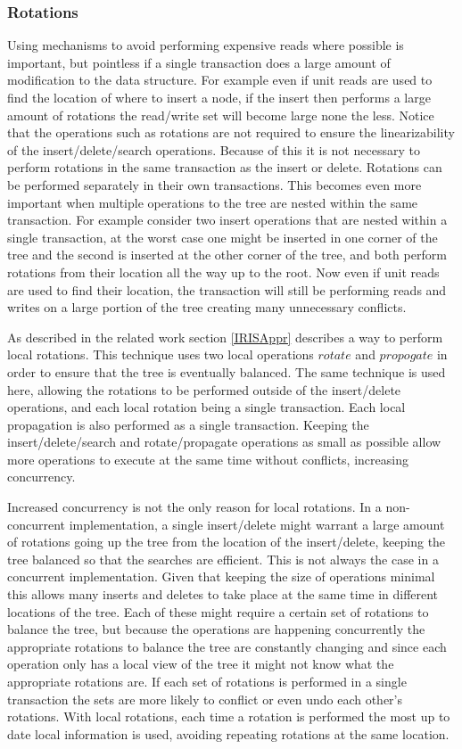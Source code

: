 \documentclass[10pt]{sigplanconf}
\begin{document}
\subsubsection{Rotations}
Using mechanisms to avoid performing expensive reads where possible is important, but pointless if a single transaction does a large amount of modification to the data structure.
For example even if unit reads are used to find the location of where to insert a node, if the insert then performs a large amount of rotations
the read/write set will become large none the less.
Notice that the operations such as rotations are not required to ensure the linearizability of the insert/delete/search operations.
Because of this it is not necessary to perform rotations in the same transaction as the insert or delete.
Rotations can be performed separately in their own transactions.
This becomes even more important when multiple operations to the tree are nested within the same transaction.
For example consider two insert operations that are nested within a single transaction, at the worst case one might be inserted in one corner of the tree
and the second is inserted at the other corner of the tree, and both perform rotations from their location all the way up to the root.
Now even if unit reads are used to find their location, the transaction will still be performing reads and writes on a large portion of the tree creating many unnecessary conflicts.

As described in the related work section \ref{IRISAppr} describes a way to perform local rotations.
This technique uses two local operations $rotate$ and $propogate$ in order to ensure that the tree is eventually balanced.
The same technique is used here, allowing the rotations to be performed outside of the insert/delete operations, and each local rotation being a single transaction.
Each local propagation is also performed as a single transaction.
Keeping the insert/delete/search and rotate/propagate operations as small as possible allow more operations to execute at the same time without conflicts, increasing concurrency.

Increased concurrency is not the only reason for local rotations.
In a non-concurrent implementation, a single insert/delete might warrant a large amount of rotations going up the tree from the location of the insert/delete,
keeping the tree balanced so that the searches are efficient.
This is not always the case in a concurrent implementation.
Given that keeping the size of operations minimal this allows many inserts and deletes to take place at the same time in different locations of the tree.
Each of these might require a certain set of rotations to balance the tree, but because the operations are happening concurrently the appropriate rotations to balance the tree are constantly changing
and since each operation only has a local view of the tree it might not know what the appropriate rotations are.
If each set of rotations is performed in a single transaction the sets are more likely to conflict or even undo each other's rotations.
With local rotations, each time a rotation is performed the most up to date local information is used, avoiding repeating rotations at the same location.
\end{document}
